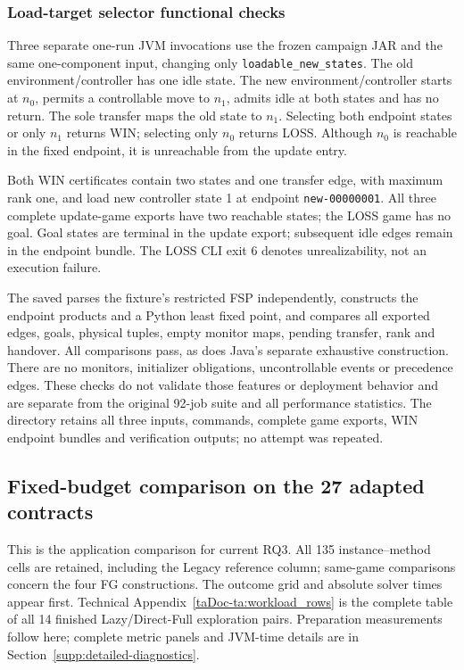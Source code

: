 \documentclass[11pt]{article}
\begin{document}
\subsubsection{Load-target selector functional checks}
Three separate one-run JVM invocations use the frozen campaign JAR and the same one-component input, changing only \texttt{loadable\_new\_states}. The old environment/controller has one idle state. The new environment/controller starts at $n_0$, permits a controllable move to $n_1$, admits idle at both states and has no return. The sole transfer maps the old state to $n_1$. Selecting both endpoint states or only $n_1$ returns WIN; selecting only $n_0$ returns LOSS. Although $n_0$ is reachable in the fixed endpoint, it is unreachable from the update entry.

Both WIN certificates contain two states and one transfer edge, with maximum rank one, and load new controller state 1 at endpoint \texttt{new-00000001}. All three complete update-game exports have two reachable states; the LOSS game has no goal. Goal states are terminal in the update export; subsequent idle edges remain in the endpoint bundle. The LOSS CLI exit 6 denotes unrealizability, not an execution failure.

The saved  parses the fixture's restricted FSP independently, constructs the endpoint products and a Python least fixed point, and compares all exported edges, goals, physical tuples, empty monitor maps, pending transfer, rank and handover. All comparisons pass, as does Java's separate exhaustive construction. There are no monitors, initializer obligations, uncontrollable events or precedence edges. These checks do not validate those features or deployment behavior and are separate from the original 92-job suite and all performance statistics. The directory retains all three inputs, commands, complete game exports, WIN endpoint bundles and verification outputs; no attempt was repeated.

\subsection{Fixed-budget comparison on the 27 adapted contracts}
\label{supp:fixed-budget}
This is the application comparison for current RQ3. All 135 instance--method cells are retained, including the Legacy reference column; same-game comparisons concern the four FG constructions. The outcome grid and absolute solver times appear first. Technical Appendix~\ref{taDoc-ta:workload_rows} is the complete table of all 14 finished Lazy/Direct-Full exploration pairs. Preparation measurements follow here; complete metric panels and JVM-time details are in Section~\ref{supp:detailed-diagnostics}.
\end{document}
